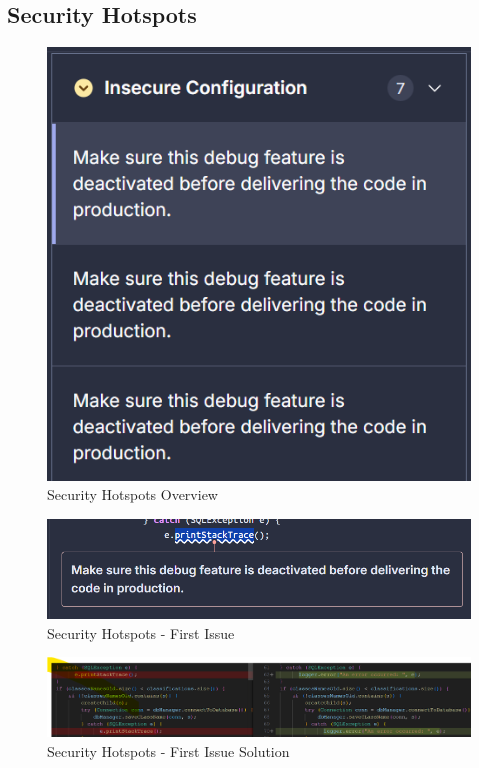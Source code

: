 \documentclass[12pt,a4paper]{article}
\begin{document}
\subsection{Security Hotspots}
\begin{figure}[H]
    \centering
    \includegraphics[width=1\textwidth]{Security Hotspots-7i.png}
    \caption{Security Hotspots Overview}
    \label{fig:7I}
\end{figure}
\begin{figure}[H]
    \centering
    \includegraphics[width=1\textwidth]{Security Hotspots-1st.png}
    \caption{Security Hotspots - First Issue}
    \label{fig:SH-1st}
\end{figure}
\begin{figure}[H]
    \centering
    \includegraphics[width=1\textwidth]{Security Hotspots-1stS.png}
    \caption{Security Hotspots - First Issue Solution}
    \label{fig:SH-1stS}
\end{figure}
\end{document}
